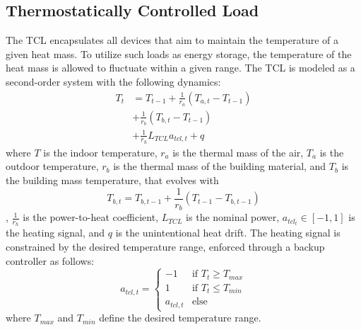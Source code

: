 \subsection{Thermostatically Controlled Load}\label{ssec:tcl}
The TCL encapsulates all devices that aim to maintain the temperature of a given heat mass. To utilize such loads as energy storage, the temperature of the heat mass is allowed to fluctuate within a given range. The TCL is modeled as a second-order system \cite{Sonderegger.1978} with the following dynamics:
\begin{equation}
    \begin{split}
        T_t &= T_{t-1} + \frac{1}{r_a} (T_{a, t} - T_{t-1}) \\
        &+ \frac{1}{r_b} (T_{b,t} - T_{t-1}) \\
        &+ \frac{1}{r_h} L_{TCL} a_{tcl,t} + q
    \end{split}
\end{equation}
where $T$ is the indoor temperature, $r_a$ is the thermal mass of the air, $T_{a}$ is the outdoor temperature, $r_b$ is the thermal mass of the building material, and $T_{b}$ is the  building mass temperature, that evolves with
\begin{equation}
    T_{b, t} = T_{b, t-1} + \frac{1}{r_b} (T_{t-1} - T_{b, t-1})
\end{equation},
$\frac{1}{r_h}$ is the power-to-heat coefficient, $L_{TCL}$ is the nominal power, 
$a_{tcl_t} \in [-1, 1]$ is the heating signal, and $q$ is the unintentional heat drift. The heating signal is constrained by the desired temperature range, enforced through a backup controller as follows:
\begin{equation}
    a_{tcl, t} = \begin{cases}
        -1 & \text{if } T_t \geq T_{max} \\
        1 & \text{if } T_t \leq T_{min} \\
        a_{tcl, t} & \text{else} 
    \end{cases}
\end{equation}
where $T_{max}$ and $T_{min}$ define the desired temperature range. 


